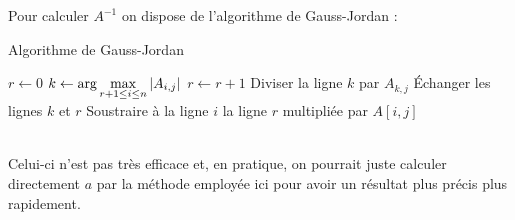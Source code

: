 \documentclass{cours}
\begin{document}
    Pour calculer $A^{-1}$ on dispose de l'algorithme de Gauss-Jordan :
    \begin{algorithm}
        \caption{Algorithme de Gauss-Jordan}
        \begin{algorithmic}
            \State $r \gets 0$
            \State $k \gets \arg \max\limits_{r + 1 \leq i \leq n} \left|A_{i, j}\right|$
            \State $r \gets r + 1$
            \State Diviser la ligne $k$ par $A_{k, j}$
            \State Échanger les lignes $k$ et $r$
            \EndIf
            \State Soustraire à la ligne $i$ la ligne $r$ multipliée par $A[i, j]$
            \EndIf
            \EndFor
            \EndIf
            \EndFor
        \end{algorithmic}
    \end{algorithm}\\
    Celui-ci n'est pas très efficace et, en pratique, on pourrait juste calculer directement $a$ par la méthode employée ici pour avoir un résultat plus précis plus rapidement. 
\end{document}
